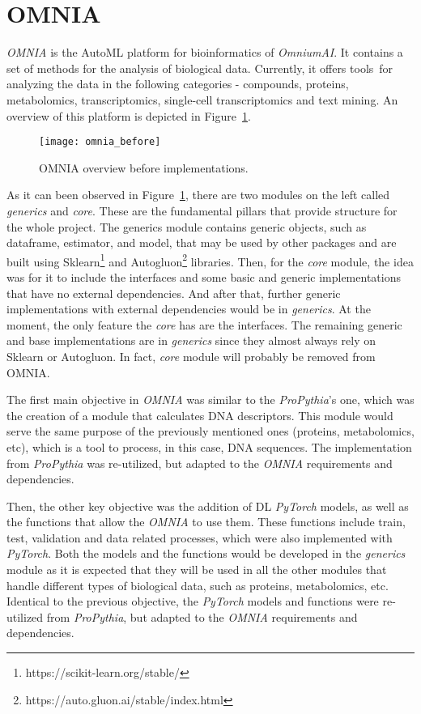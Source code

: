 \section{OMNIA}

\textit{OMNIA} is the \gls{AutoML} platform for bioinformatics of \textit{OmniumAI}. It contains a set of methods for the analysis of biological data. Currently, it offers tools for analyzing the data in the following categories - compounds, proteins, metabolomics, transcriptomics, single-cell transcriptomics and text mining. An overview of this platform is depicted in Figure~\ref{fig:omnia_before}.

\begin{figure}[htbp]
    \centering
    \texttt{[image: omnia\_before]}
    \caption{OMNIA overview before implementations.}
    \label{fig:omnia_before}
\end{figure}

As it can been observed in Figure~\ref{fig:omnia_before}, there are two modules on the left called \textit{generics} and \textit{core}. These are the fundamental pillars that provide structure for the whole project. The generics module contains generic objects, such as dataframe, estimator, and model, that may be used by other packages and are built using Sklearn\footnote{https://scikit-learn.org/stable/} and Autogluon\footnote{https://auto.gluon.ai/stable/index.html} libraries. Then, for the \textit{core} module, the idea was for it to include the interfaces and some basic and generic implementations that have no external dependencies. And after that, further generic implementations with external dependencies would be in \textit{generics}. At the moment, the only feature the \textit{core} has are the interfaces. The remaining generic and base implementations are in \textit{generics} since they almost always rely on Sklearn or Autogluon. In fact, \textit{core} module will probably be removed from OMNIA.

The first main objective in \textit{OMNIA} was similar to the \textit{ProPythia}'s one, which was the creation of a module that calculates \gls{DNA} descriptors. This module would serve the same purpose of the previously mentioned ones (proteins, metabolomics, etc), which is a tool to process, in this case, \gls{DNA} sequences. The implementation from \textit{ProPythia} was re-utilized, but adapted to the \textit{OMNIA} requirements and dependencies.

Then, the other key objective was the addition of \gls{DL} \textit{PyTorch} models, as well as the functions that allow the \textit{OMNIA} to use them. These functions include train, test, validation and data related processes, which were also implemented with \textit{PyTorch}. Both the models and the functions would be developed in the \textit{generics} module as it is expected that they will be used in all the other modules that handle different types of biological data, such as proteins, metabolomics, etc. Identical to the previous objective, the \textit{PyTorch} models and functions were re-utilized from \textit{ProPythia}, but adapted to the \textit{OMNIA} requirements and dependencies.

